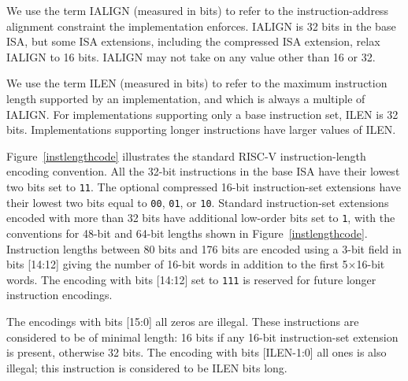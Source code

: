 We use the term IALIGN (measured in bits) to refer to the instruction-address
alignment constraint the implementation enforces.  IALIGN is 32 bits in the
base ISA, but some ISA extensions, including the compressed ISA extension,
relax IALIGN to 16 bits.  IALIGN may not take on any value other than 16 or
32.

We use the term ILEN (measured in bits) to refer to the maximum
instruction length supported by an implementation, and which is always
a multiple of IALIGN.  For implementations supporting only a base
instruction set, ILEN is 32 bits.  Implementations supporting longer
instructions have larger values of ILEN.

Figure~\ref{instlengthcode} illustrates the standard RISC-V
instruction-length encoding convention.  All the 32-bit instructions
in the base ISA have their lowest two bits set to {\tt 11}.  The
optional compressed 16-bit instruction-set extensions have their
lowest two bits equal to {\tt 00}, {\tt 01}, or {\tt 10}.  Standard
instruction-set extensions encoded with more than 32 bits have
additional low-order bits set to {\tt 1}, with the conventions for
48-bit and 64-bit lengths shown in Figure~\ref{instlengthcode}.
Instruction lengths between 80 bits and 176 bits are encoded using a
3-bit field in bits [14:12] giving the number of 16-bit words in
addition to the first 5$\times$16-bit words.  The encoding with bits
[14:12] set to {\tt 111} is reserved for future longer instruction
encodings.

The encodings with bits [15:0] all zeros are illegal.  These instructions are
considered to be of minimal length: 16 bits if any 16-bit instruction-set
extension is present, otherwise 32 bits.  The encoding with bits [ILEN-1:0]
all ones is also illegal; this instruction is considered to be ILEN bits long.

